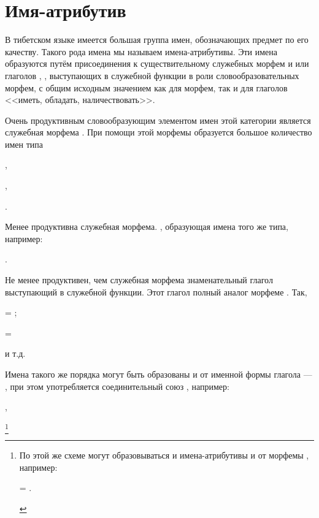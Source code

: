 \section{Имя-атрибутив}

В тибетском языке имеется большая группа имен, обозначающих предмет по его качеству. Такого рода имена мы называем имена-атрибутивы. Эти имена образуются путём присоединения к существительному служебных морфем  и  или глаголов , ,  выступающих в служебной функции в роли словообразовательных морфем, с общим исходным значением как для морфем, так и для глаголов <<иметь, обладать, наличествовать>>.

Очень продуктивным словообразующим элементом имен этой категории является служебная морфема	. При помощи этой морфемы образуется большое количество имен типа
\begin{prfsample}
    \item {},
    \item {},
    \item {}.
\end{prfsample}

Менее продуктивна служебная морфема. , образующая имена того же типа, например:
\begin{prfsample}
    \item {}.
\end{prfsample}

Не менее продуктивен, чем служебная морфема  знаменательный глагол  выступающий в служебной функции. Этот глагол полный аналог морфеме . Так,
\begin{prfsample}
    \item {} = ;
    \item {} = 
\end{prfsample}
и т.д.

Имена такого же порядка могут быть образованы и от именной формы глагола  --- , при этом употребляется соединительный союз , например:
\begin{prfsample}
    \item {},
    \item {}\footnote[31]{По этой же схеме могут образовываться и имена-атрибутивы и от морфемы , например:
    \begin{prfsample}
        \item {} = .
    \end{prfsample}
    }
\end{prfsample}

